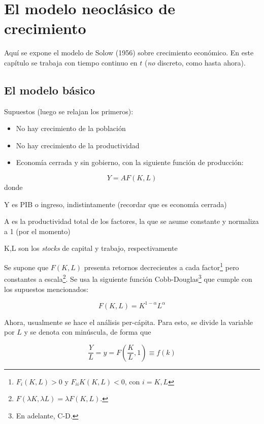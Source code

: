 \documentclass[DeGregorioResumen]{subfiles}
\begin{document}
\section{El modelo neoclásico de crecimiento}
Aquí se expone el modelo de Solow (1956) sobre crecimiento económico. En este capítulo se trabaja con tiempo continuo en $t$ (\emph{no} discreto, como hasta ahora).

\subsection{El modelo básico}
Supuestos (luego se relajan los primeros):
\begin{itemize}
\item No hay crecimiento de la población
\item No hay crecimiento de la productividad
\item Economía cerrada y sin gobierno, con la siguiente función de producción:
\end{itemize}

\begin{equation}
Y=AF(K,L)
\end{equation}
donde
\begin{where}
\item[Y] es PIB o ingreso, indistintamente (recordar que es economía cerrada)
\item[A] es la productividad total de los factores, la que se asume constante y normaliza a 1 (por el momento)
\item[K,L] son los \textit{stocks} de capital y trabajo, respectivamente
\end{where}

Se supone que $F(K,L)$ presenta retornos decrecientes a cada factor\footnote{$F_i(K,L)>0$ y $F_{ii}K(K,L)<0$, con $i=K,L$} pero constantes a escala\footnote{$F(\lambda K, \lambda L)=\lambda F(K,L)$.}. Se usa la siguiente función Cobb-Douglas\footnote{En adelante, C-D.} que cumple con los supuestos mencionados:

\begin{equation*}
F(K,L)=K^{1-\alpha}L^\alpha
\end{equation*}

Ahora, usualmente se hace el análisis per-cápita. Para esto, se divide la variable por $L$ y se denota con minúscula, de forma que

\begin{equation}
\frac{Y}{L} = y = F\left(\frac{K}{L}, 1\right) \equiv f(k)
\label{eq:11_funcion_crecimiento}
\end{equation}
\end{document}
